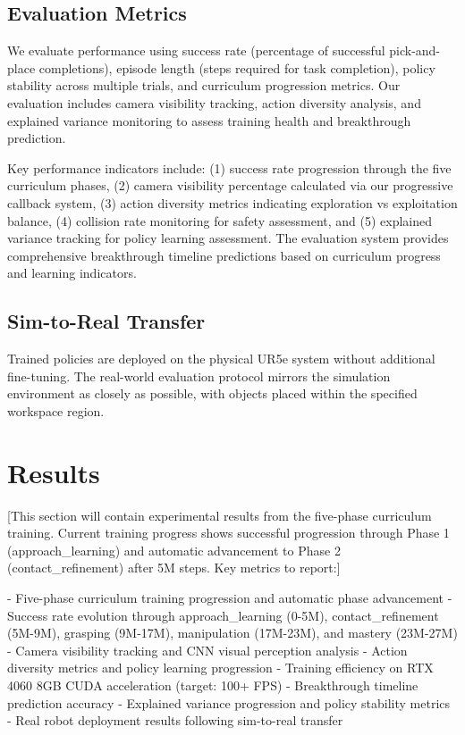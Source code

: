 \documentclass[conference]{IEEEtran}
\begin{document}
\subsection{Evaluation Metrics}
We evaluate performance using success rate (percentage of successful pick-and-place completions), episode length (steps required for task completion), policy stability across multiple trials, and curriculum progression metrics. Our evaluation includes camera visibility tracking, action diversity analysis, and explained variance monitoring to assess training health and breakthrough prediction.

Key performance indicators include: (1) success rate progression through the five curriculum phases, (2) camera visibility percentage calculated via our progressive callback system, (3) action diversity metrics indicating exploration vs exploitation balance, (4) collision rate monitoring for safety assessment, and (5) explained variance tracking for policy learning assessment. The evaluation system provides comprehensive breakthrough timeline predictions based on curriculum progress and learning indicators.

\subsection{Sim-to-Real Transfer}
Trained policies are deployed on the physical UR5e system without additional fine-tuning. The real-world evaluation protocol mirrors the simulation environment as closely as possible, with objects placed within the specified workspace region.

\section{Results}
[This section will contain experimental results from the five-phase curriculum training. Current training progress shows successful progression through Phase 1 (approach_learning) and automatic advancement to Phase 2 (contact_refinement) after 5M steps. Key metrics to report:]

- Five-phase curriculum training progression and automatic phase advancement
- Success rate evolution through approach_learning (0-5M), contact_refinement (5M-9M), grasping (9M-17M), manipulation (17M-23M), and mastery (23M-27M)
- Camera visibility tracking and CNN visual perception analysis
- Action diversity metrics and policy learning progression
- Training efficiency on RTX 4060 8GB CUDA acceleration (target: 100+ FPS)
- Breakthrough timeline prediction accuracy
- Explained variance progression and policy stability metrics
- Real robot deployment results following sim-to-real transfer
\end{document}
